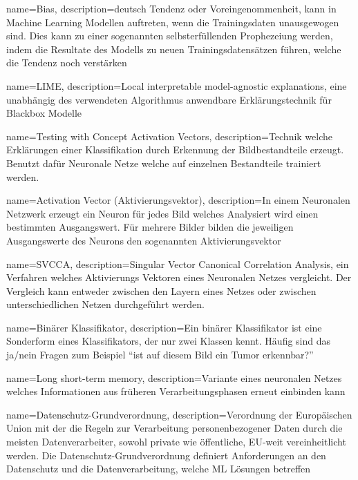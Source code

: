 {
	name=Bias,
	description={deutsch Tendenz oder Voreingenommenheit, kann in Machine Learning Modellen auftreten, wenn die Trainingsdaten unausgewogen sind. Dies kann zu einer sogenannten selbsterfüllenden Prophezeiung werden, indem die Resultate des Modells zu neuen Trainingsdatensätzen führen, welche die Tendenz noch verstärken}  
}

{
	name=LIME,
	description={Local interpretable model-agnostic explanations, eine unabhängig des verwendeten Algorithmus anwendbare Erklärungstechnik für Blackbox Modelle}
}

{
	name=Testing with Concept Activation Vectors,
	description={Technik welche Erklärungen einer Klassifikation durch Erkennung der Bildbestandteile erzeugt. Benutzt dafür Neuronale Netze welche auf einzelnen Bestandteile trainiert werden. \parencite{Kim2017}}
}

{
	name=Activation Vector (Aktivierungsvektor),
	description={In einem Neuronalen Netzwerk erzeugt ein Neuron für jedes Bild welches Analysiert wird einen bestimmten Ausgangswert. Für mehrere Bilder bilden die jeweiligen Ausgangswerte des Neurons den sogenannten Aktivierungsvektor}
}

{
	name=SVCCA,
     description={Singular Vector Canonical Correlation Analysis, ein Verfahren welches Aktivierungs Vektoren eines Neuronalen Netzes vergleicht. Der Vergleich kann entweder zwischen den Layern eines Netzes oder zwischen unterschiedlichen Netzen durchgeführt werden. \parencite{Raghu2017}}
}

{
	name=Binärer Klassifikator,
     description={Ein binärer Klassifikator ist eine Sonderform eines Klassifikators, der nur zwei Klassen kennt. Häufig sind das ja/nein Fragen zum Beispiel ``ist auf diesem Bild ein Tumor erkennbar?''}
}

{
	name=Long short-term memory,
     description={Variante eines neuronalen Netzes welches Informationen aus früheren Verarbeitungsphasen erneut einbinden kann}
}

{
	name=Datenschutz-Grundverordnung,
     description={Verordnung der Europäischen Union mit der die Regeln zur Verarbeitung personenbezogener Daten durch die meisten Datenverarbeiter, sowohl private wie öffentliche, EU-weit vereinheitlicht werden. Die Datenschutz-Grundverordnung definiert Anforderungen an den Datenschutz und die Datenverarbeitung, welche \Gls{ML} Lösungen betreffen}
}

